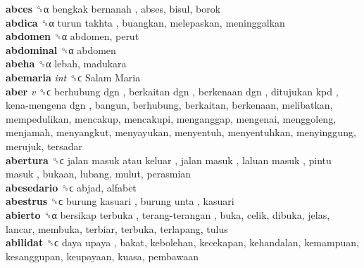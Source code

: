 \textbf{abces} ␝α   bengkak bernanah , abses, bisul, borok  \\
\textbf{abdica} ␝α   turun takhta , buangkan, melepaskan, meninggalkan  \\
\textbf{abdomen} ␝α  abdomen, perut  \\
\textbf{abdominal} ␝α  abdomen  \\
\textbf{abeha} ␝α  lebah, madukara  \\
\textbf{abemaria} \emph{int}  ␝ϲ   Salam Maria   \\
\textbf{aber} \emph{v}  ␝ϲ   berhubung dgn ,  berkaitan dgn ,  berkenaan dgn ,  ditujukan kpd ,  kena-mengena dgn , bangun, berhubung, berkaitan, berkenaan, melibatkan, mempedulikan, mencakup, mencakupi, menganggap, mengenai, menggoleng, menjamah, menyangkut, menyayukan, menyentuh, menyentuhkan, menyinggung, merujuk, tersadar  \\
\textbf{abertura} ␝ϲ   jalan masuk atau keluar ,  jalan masuk ,  laluan masuk ,  pintu masuk , bukaan, lubang, mulut, perasmian  \\
\textbf{abesedario} ␝ϲ  abjad, alfabet  \\
\textbf{abestrus} ␝ϲ   burung kasuari ,  burung unta , kasuari  \\
\textbf{abierto} ␝α   bersikap terbuka ,  terang-terangan , buka, celik, dibuka, jelas, lancar, membuka, terbiar, terbuka, terlapang, tulus  \\
\textbf{abilidat} ␝ϲ   daya upaya , bakat, kebolehan, kecekapan, kehandalan, kemampuan, kesanggupan, keupayaan, kuasa, pembawaan  \\
